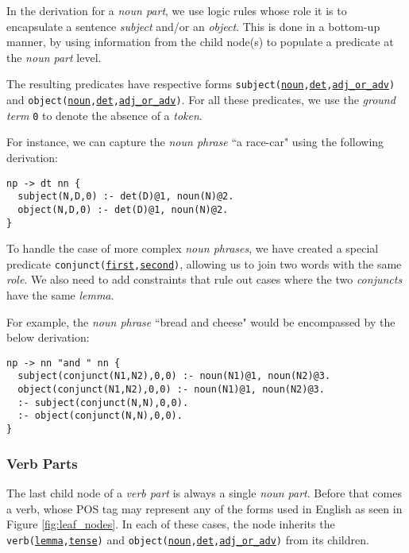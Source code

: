 In the derivation for a \textit{noun part}, we use logic rules whose role it is to encapsulate a sentence \textit{subject} and/or an \textit{object}. This is done in a bottom-up manner, by using information from the child node(s) to populate a predicate at the \textit{noun part} level.

The resulting predicates have respective forms \texttt{subject(\underline{noun},\underline{det},\underline{adj\_or\_adv})} and \texttt{object(\underline{noun},\underline{det},\underline{adj\_or\_adv})}. For all these predicates, we use the \textit{ground term} \texttt{0} to denote the absence of a \textit{token}.

For instance, we can capture the \textit{noun phrase} ``a race-car" using the following derivation:

\begin{displayquote}
\begin{lstlisting}
np -> dt nn {
  subject(N,D,0) :- det(D)@1, noun(N)@2.
  object(N,D,0) :- det(D)@1, noun(N)@2.
}
\end{lstlisting}
\end{displayquote}

To handle the case of more complex \textit{noun phrases}, we have created a special predicate \texttt{conjunct(\underline{first},\underline{second})}, allowing us to join two words with the same \textit{role}. We also need to add constraints that rule out cases where the two \textit{conjuncts} have the same \textit{lemma}.

For example, the \textit{noun phrase} ``bread and cheese" would be encompassed by the below derivation:

\begin{displayquote}
\begin{lstlisting}
np -> nn "and " nn {
  subject(conjunct(N1,N2),0,0) :- noun(N1)@1, noun(N2)@3.
  object(conjunct(N1,N2),0,0) :- noun(N1)@1, noun(N2)@3.
  :- subject(conjunct(N,N),0,0).
  :- object(conjunct(N,N),0,0).
}
\end{lstlisting}
\end{displayquote}

\subsubsection{Verb Parts}

The last child node of a \textit{verb part} is always a single \textit{noun part}. Before that comes a verb, whose POS tag may represent any of the forms used in English as seen in Figure \ref{fig:leaf_nodes}. In each of these cases, the node inherits the \texttt{verb(\underline{lemma},\underline{tense})} and \texttt{object(\underline{noun},\underline{det},\underline{adj\_or\_adv})} from its children.

